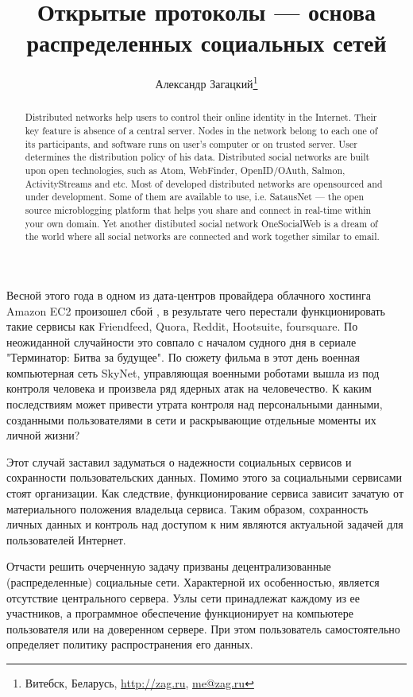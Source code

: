 \documentclass[10pt, a5paper]{article}
\begin{document}
\title{Открытые протоколы --- основа распределенных социальных сетей}
\author{Александр Загацкий\footnote{Витебск, Беларусь, \url{http://zag.ru}, \url{me@zag.ru}}}
\date{}
\maketitle

\begin{abstract}Distributed networks help users to control their online identity in the Internet.
Their key feature is absence of a central server. Nodes
in the network belong to each one of its
participants, and software runs on user's computer
or on trusted server. User determines the distribution policy
of his data.
Distributed social networks are built upon open technologies, such as Atom,
WebFinder, OpenID/OAuth, Salmon, ActivityStreams and etc.
Most of developed distributed networks are opensourced and under
development. Some of them are available to use, i.e. 
SatausNet --- the open source microblogging platform that
helps you share and connect in real-time within your own domain. Yet
another distibuted social network OneSocialWeb is a dream of the world where
all social networks are connected and work together similar
to email.
\end{abstract}
Весной этого года в одном из дата-центров провайдера облачного хостинга
Amazon EC2 произошел сбой \cite{zag1}, в результате чего перестали
 функционировать такие сервисы как Friendfeed, Quora, Reddit, Hootsuite,
 foursquare. По неожиданной случайности это совпало с началом судного дня
 в сериале "Терминатор: Битва за будущее". По сюжету фильма в этот день
 военная компьютерная сеть SkyNet, управляющая военными роботами вышла из
 под контроля человека и произвела ряд ядерных атак на человечество. К
 каким последствиям может привести утрата контроля над персональными
 данными, созданными пользователями в сети и раскрывающие отдельные
 моменты их личной жизни?

 Этот случай заставил задуматься о надежности социальных сервисов и
 сохранности пользовательских данных. Помимо этого за социальными
 сервисами стоят организации. Как следствие, функционирование сервиса
 зависит зачатую от материального положения владельца сервиса. Таким
 образом, сохранность личных данных и контроль над доступом к ним являются
 актуальной задачей для пользователей Интернет.

 Отчасти решить очерченную задачу призваны децентрализованные
 (распределенные) социальные сети. Характерной их особенностью, является
 отсутствие центрального сервера. Узлы сети принадлежат каждому из ее
 участников, а программное обеспечение функционирует на компьютере
 пользователя или на доверенном сервере. При этом пользователь
 самостоятельно определяет политику распространения его данных.
\end{document}
